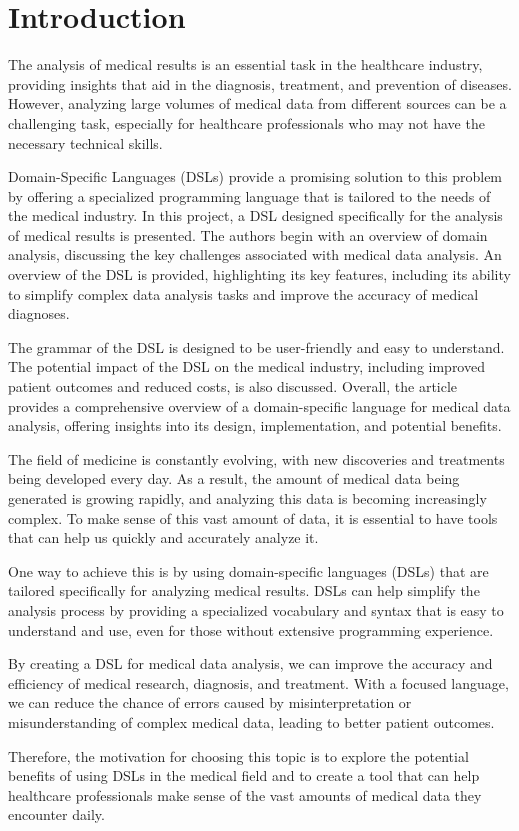 \chapter*{Introduction}

The analysis of medical results is an essential task in the healthcare industry, providing insights that aid in the diagnosis, treatment, and prevention of diseases. However, analyzing large volumes of medical data from different sources can be a challenging task, especially for healthcare professionals who may not have the necessary technical skills. \par
Domain-Specific Languages (DSLs) provide a promising solution to this problem by offering a specialized programming language that is tailored to the needs of the medical industry. In this project, a DSL designed specifically for the analysis of medical results is presented. The authors begin with an overview of domain analysis, discussing the key challenges associated with medical data analysis. An overview of the DSL is provided, highlighting its key features, including its ability to simplify complex data analysis tasks and improve the accuracy of medical diagnoses. \par
The grammar of the DSL is designed to be user-friendly and easy to understand. The potential impact of the DSL on the medical industry, including improved patient outcomes and reduced costs, is also discussed. Overall, the article provides a comprehensive overview of a domain-specific language for medical data analysis, offering insights into its design, implementation, and potential benefits.

The field of medicine is constantly evolving, with new discoveries and treatments being developed every day. As a result, the amount of medical data being generated is growing rapidly, and analyzing this data is becoming increasingly complex. To make sense of this vast amount of data, it is essential to have tools that can help us quickly and accurately analyze it.

One way to achieve this is by using domain-specific languages (DSLs) that are tailored specifically for analyzing medical results. DSLs can help simplify the analysis process by providing a specialized vocabulary and syntax that is easy to understand and use, even for those without extensive programming experience.

By creating a DSL for medical data analysis, we can improve the accuracy and efficiency of medical research, diagnosis, and treatment. With a focused language, we can reduce the chance of errors caused by misinterpretation or misunderstanding of complex medical data, leading to better patient outcomes.

Therefore, the motivation for choosing this topic is to explore the potential benefits of using DSLs in the medical field and to create a tool that can help healthcare professionals make sense of the vast amounts of medical data they encounter daily.
